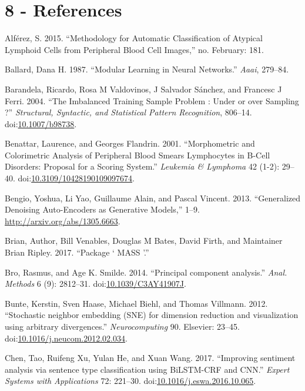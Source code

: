 \documentclass[]{article}
\begin{document}
\newpage

\section*{8 - References}\label{references}

Alf{é}rez, S. 2015. ``Methodology for Automatic Classification of
Atypical Lymphoid Cells from Peripheral Blood Cell Images,'' no.
February: 181.

Ballard, Dana H. 1987. ``Modular Learning in Neural Networks.''
\emph{Aaai}, 279--84.

Barandela, Ricardo, Rosa M Valdovinos, J Salvador S{á}nchez, and
Francesc J Ferri. 2004. ``The Imbalanced Training Sample Problem : Under
or over Sampling ?'' \emph{Structural, Syntactic, and Statistical
Pattern Recognition}, 806--14.
doi:\href{http://dx.doi.org/10.1007/b98738}{10.1007/b98738}.

Benattar, Laurence, and Georges Flandrin. 2001. ``Morphometric and
Colorimetric Analysis of Peripheral Blood Smears Lymphocytes in B-Cell
Disorders: Proposal for a Scoring System.'' \emph{Leukemia \& Lymphoma}
42 (1-2): 29--40.
doi:\href{http://dx.doi.org/10.3109/10428190109097674}{10.3109/10428190109097674}.

Bengio, Yoshua, Li Yao, Guillaume Alain, and Pascal Vincent. 2013.
``Generalized Denoising Auto-Encoders as Generative Models,'' 1--9.
\url{http://arxiv.org/abs/1305.6663}.

Brian, Author, Bill Venables, Douglas M Bates, David Firth, and
Maintainer Brian Ripley. 2017. ``Package ` MASS '.''

Bro, Rasmus, and Age K. Smilde. 2014. ``Principal component analysis.''
\emph{Anal. Methods} 6 (9): 2812--31.
doi:\href{http://dx.doi.org/10.1039/C3AY41907J}{10.1039/C3AY41907J}.

Bunte, Kerstin, Sven Haase, Michael Biehl, and Thomas Villmann. 2012.
``Stochastic neighbor embedding (SNE) for dimension reduction and
visualization using arbitrary divergences.'' \emph{Neurocomputing} 90.
Elsevier: 23--45.
doi:\href{http://dx.doi.org/10.1016/j.neucom.2012.02.034}{10.1016/j.neucom.2012.02.034}.

Chen, Tao, Ruifeng Xu, Yulan He, and Xuan Wang. 2017. ``Improving
sentiment analysis via sentence type classification using BiLSTM-CRF and
CNN.'' \emph{Expert Systems with Applications} 72: 221--30.
doi:\href{http://dx.doi.org/10.1016/j.eswa.2016.10.065}{10.1016/j.eswa.2016.10.065}.
\end{document}
